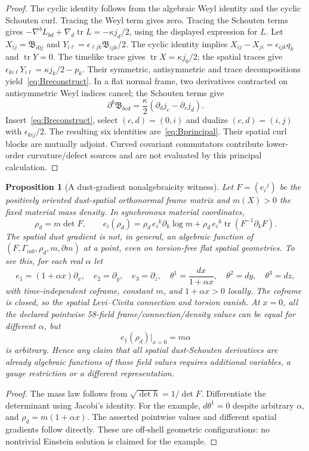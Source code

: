 \documentclass[11pt,a4paper]{article}
\newtheorem{proposition}[theorem]{Proposition}
\newcommand{\kap}{\kappa}
\begin{document}
\begin{proof}
The cyclic identity follows from the algebraic Weyl identity and the cyclic Schouten curl. Tracing the Weyl term gives zero. Tracing the Schouten terms gives $-\nabla^b L_{bd}+\nabla_d\operatorname{tr}L=-\kap j_d/2$, using the displayed expression for $L$. Let $X_{ij}=\mathfrak B_{i0j}$ and $Y_{i\ell}=\epsilon_{\ell jk}\mathfrak B_{ijk}/2$. The cyclic identity implies $X_{ij}-X_{ji}=\epsilon_{ijk}q_k$ and $\operatorname{tr}Y=0$. The timelike trace gives $\operatorname{tr}X=\kap j_0/2$; the spatial traces give $\epsilon_{ki\ell}Y_{i\ell}=\kap j_k/2-p_k$. Their symmetric, antisymmetric and trace decompositions yield~\eqref{eq:Breconstruct}. In a flat normal frame, two derivatives contracted on antisymmetric Weyl indices cancel; the Schouten terms give
\[\partial^b\mathfrak B_{bcd}=\frac\kap2(\partial_dj_c-\partial_cj_d).\]
Insert~\eqref{eq:Breconstruct}, select $(c,d)=(0,i)$ and dualize $(c,d)=(i,j)$ with $\epsilon_{kij}/2$. The resulting six identities are~\eqref{eq:Bprincipal}. Their spatial curl blocks are mutually adjoint. Curved covariant commutators contribute lower-order curvature/defect sources and are not evaluated by this principal calculation.
\end{proof}

\begin{proposition}[A dust-gradient nonalgebraicity witness]\label{prop:gradientgap}
Let $F=(e_i{}^j)$ be the positively oriented dust-spatial orthonormal frame matrix and $m(X)>0$ the fixed material mass density. In synchronous material coordinates,
\begin{equation}\label{eq:detgradient}
\rho_d=m\det F,\qquad
e_i(\rho_d)=\rho_d\,e_i{}^k\partial_k\log m+
\rho_d\,e_i{}^k\operatorname{tr}(F^{-1}\partial_kF).
\end{equation}
The spatial dust gradient is not, in general, an algebraic function of $(F,\Gamma_{iab},\rho_d,m,\partial m)$ at a point, even on torsion-free flat spatial geometries. To see this, for each real $\alpha$ let
\[e_1=(1+\alpha x)\partial_x,\quad e_2=\partial_y,\quad e_3=\partial_z,\quad
\theta^1=\frac{dx}{1+\alpha x},\quad\theta^2=dy,\quad\theta^3=dz,
\]
with time-independent coframe, constant $m$, and $1+\alpha x>0$ locally. The coframe is closed, so the spatial Levi--Civita connection and torsion vanish. At $x=0$, all the declared pointwise 58-field frame/connection/density values can be equal for different $\alpha$, but
\[e_1(\rho_d)\big|_{x=0}=m\alpha\]
is arbitrary. Hence any claim that all spatial dust-Schouten derivatives are already algebraic functions of those field values requires additional variables, a gauge restriction or a different representation.
\end{proposition}
\begin{proof}The mass law follows from $\sqrt{\det h}=1/\det F$. Differentiate the determinant using Jacobi's identity. For the example, $d\theta^1=0$ despite arbitrary $\alpha$, and $\rho_d=m(1+\alpha x)$. The asserted pointwise values and different spatial gradients follow directly. These are off-shell geometric configurations: no nontrivial Einstein solution is claimed for the example.\end{proof}
\end{document}
